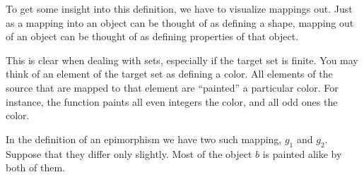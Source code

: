 \documentclass[DaoFP]{subfiles}
\begin{document}
To get some insight into this definition, we have to visualize mappings out. Just as a mapping into an object can be thought of as defining a shape, mapping out of an object can be thought of as defining properties of that object. 

This is clear when dealing with sets, especially if the target set is finite. You may think of an element of the target set as defining a color. All elements of the source that are mapped to that element are ``painted'' a particular color. For instance, the function  paints all even integers the  color, and all odd ones the  color.

In the definition of an epimorphism we have two such mapping, $g_1$ and $g_2$. Suppose that they differ only slightly. Most of the object $b$ is painted alike by both of them.
\end{document}
